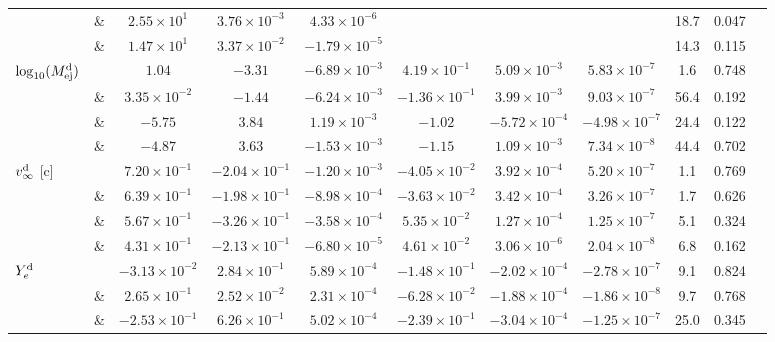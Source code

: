 \begin{sidewaystable}
{\begin{tabular}{l|l|ccccccccc}
        & \& \DSheatcool{} & $2.55\times10^{1}$ & $3.76\times10^{-3}$ & $4.33\times10^{-6}$ & & & & 18.7 & 0.047 \\ 
        & \& \DScool{} & $1.47\times10^{1}$ & $3.37\times10^{-2}$ & $-1.79\times10^{-5}$ & & & & 14.3 & 0.115 \\ 
        \hline\hline
        $\log_{10}(M^{\text{d}}_{\text{ej}})$ & \DSrefset{} & $1.04$ & $-3.31$ & $-6.89\times10^{-3}$ & $4.19\times10^{-1}$ & $5.09\times10^{-3}$ & $5.83\times10^{-7}$ & 1.6 & 0.748 \\ 
\rowcolor{lightgray} & \& \DSheatcool{} & $3.35\times10^{-2}$ & $-1.44$ & $-6.24\times10^{-3}$ & $-1.36\times10^{-1}$ & $3.99\times10^{-3}$ & $9.03\times10^{-7}$ & 56.4 & 0.192 \\ 
        & \& \DScool{} & $-5.75$ & $3.84$ & $1.19\times10^{-3}$ & $-1.02$ & $-5.72\times10^{-4}$ & $-4.98\times10^{-7}$ & 24.4 & 0.122 \\ 
        & \& \DSnone{} & $-4.87$ & $3.63$ & $-1.53\times10^{-3}$ & $-1.15$ & $1.09\times10^{-3}$ & $7.34\times10^{-8}$ & 44.4 & 0.702 \\
        \hline
        $v^{\text{d}}_\infty$ [c] & \DSrefset{} & $7.20\times10^{-1}$ & $-2.04\times10^{-1}$ & $-1.20\times10^{-3}$ & $-4.05\times10^{-2}$ & $3.92\times10^{-4}$ & $5.20\times10^{-7}$ & 1.1 & 0.769 \\ 
\rowcolor{lightgray} & \& \DSheatcool{} & $6.39\times10^{-1}$ & $-1.98\times10^{-1}$ & $-8.98\times10^{-4}$ & $-3.63\times10^{-2}$ & $3.42\times10^{-4}$ & $3.26\times10^{-7}$ & 1.7 & 0.626 \\ 
        & \& \DScool{} & $5.67\times10^{-1}$ & $-3.26\times10^{-1}$ & $-3.58\times10^{-4}$ & $5.35\times10^{-2}$ & $1.27\times10^{-4}$ & $1.25\times10^{-7}$ & 5.1 & 0.324 \\ 
        & \& \DSnone{} & $4.31\times10^{-1}$ & $-2.13\times10^{-1}$ & $-6.80\times10^{-5}$ & $4.61\times10^{-2}$ & $3.06\times10^{-6}$ & $2.04\times10^{-8}$ & 6.8 & 0.162 \\ 
        \hline
        $Y^{\text{d}}_{e}$ & \DSrefset{} & $-3.13\times10^{-2}$ & $2.84\times10^{-1}$ & $5.89\times10^{-4}$ & $-1.48\times10^{-1}$ & $-2.02\times10^{-4}$ & $-2.78\times10^{-7}$ & 9.1 & 0.824 \\ 
\rowcolor{lightgray} & \& \DSheatcool{} & $2.65\times10^{-1}$ & $2.52\times10^{-2}$ & $2.31\times10^{-4}$ & $-6.28\times10^{-2}$ & $-1.88\times10^{-4}$ & $-1.86\times10^{-8}$ & 9.7 & 0.768 \\ 
        & \& \DScool{} & $-2.53\times10^{-1}$ & $6.26\times10^{-1}$ & $5.02\times10^{-4}$ & $-2.39\times10^{-1}$ & $-3.04\times10^{-4}$ & $-1.25\times10^{-7}$ & 25.0 & 0.345 \\

\end{tabular}}
\end{sidewaystable}
